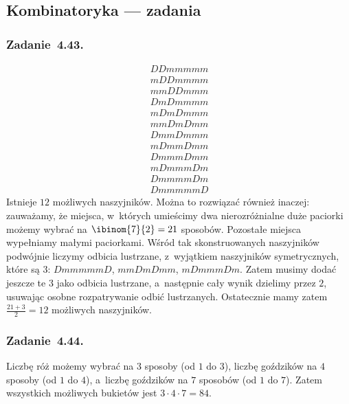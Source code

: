\subsection*{Kombinatoryka --- zadania}
\subsubsection*{Zadanie~4.43.}
\begin{gather}
    \tag{\(1\)} DDmmmmm\\
    \tag{\(2\)} mDDmmmm\\
    \tag{\(3\)} mmDDmmm\\
    \tag{\(4\)} DmDmmmm\\
    \tag{\(5\)} mDmDmmm\\
    \tag{\(6\)} mmDmDmm\\
    \tag{\(7\)} DmmDmmm\\
    \tag{\(8\)} mDmmDmm\\
    \tag{\(9\)} DmmmDmm\\
    \tag{\(10\)} mDmmmDm\\
    \tag{\(11\)} DmmmmDm\\
    \tag{\(12\)} DmmmmmD
\end{gather}
Istnieje \(12\) możliwych naszyjników. Można to rozwiązać również inaczej: zauważamy, że miejsca, w~których umieścimy dwa nierozróżnialne duże paciorki możemy wybrać na \(\ibinom{7}{2} = 21\) sposobów. Pozostałe miejsca wypełniamy małymi paciorkami. Wśród tak skonstruowanych naszyjników podwójnie liczymy odbicia lustrzane, z~wyjątkiem naszyjników symetrycznych, które są \(3\): \(DmmmmmD\), \(mmDmDmm\), \(mDmmmDm\). Zatem musimy dodać jeszcze te \(3\) jako odbicia lustrzane, a~następnie cały wynik dzielimy przez \(2\), usuwając osobne rozpatrywanie odbić lustrzanych. Ostatecznie mamy zatem \(\frac{21 + 3}{2} = 12\) możliwych naszyjników.
\subsubsection*{Zadanie~4.44.}
Liczbę róż możemy wybrać na \(3\) sposoby (od \(1\) do \(3\)), liczbę goździków na \(4\) sposoby (od \(1\) do \(4\)), a~liczbę goździków na \(7\) sposobów (od \(1\) do \(7\)). Zatem wszystkich możliwych bukietów jest \(3 \cdot 4 \cdot 7 = 84\).
